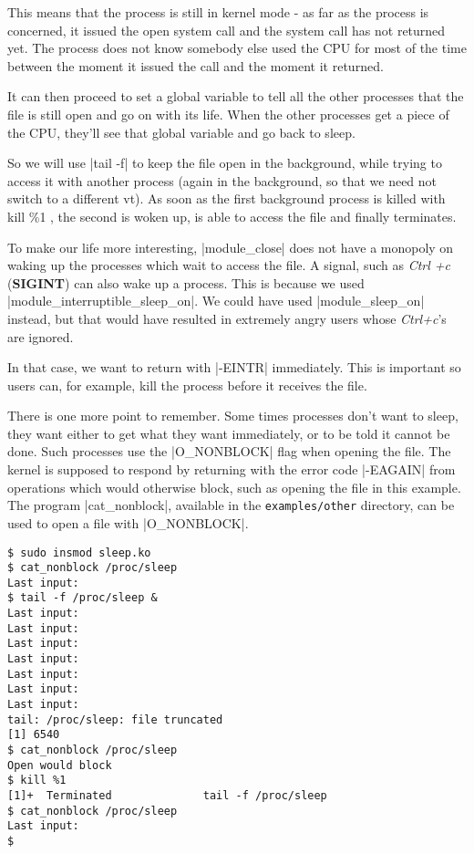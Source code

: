 \documentclass[10pt, oneside]{book}
\begin{document}
This means that the process is still in kernel mode - as far as the process is concerned, it issued the open system call and the system call has not returned yet.
The process does not know somebody else used the CPU for most of the time between the moment it issued the call and the moment it returned.

It can then proceed to set a global variable to tell all the other processes that the file is still open and go on with its life.
When the other processes get a piece of the CPU, they'll see that global variable and go back to sleep.

So we will use \sh|tail -f| to keep the file open in the background, while trying to access it with another process (again in the background, so that we need not switch to a different vt).
As soon as the first background process is killed with kill \%1 , the second is woken up, is able to access the file and finally terminates.

To make our life more interesting, \cpp|module_close| does not have a monopoly on waking up the processes which wait to access the file.
A signal, such as \emph{Ctrl +c} (\textbf{SIGINT}) can also wake up a process. This is because we used \cpp|module_interruptible_sleep_on|.
We could have used \cpp|module_sleep_on| instead, but that would have resulted in extremely angry users whose \emph{Ctrl+c}'s are ignored.

In that case, we want to return with \cpp|-EINTR| immediately. This is important so users can, for example, kill the process before it receives the file.

There is one more point to remember. Some times processes don't want to sleep, they want either to get what they want immediately, or to be told it cannot be done.
Such processes use the \cpp|O_NONBLOCK| flag when opening the file.
The kernel is supposed to respond by returning with the error code \cpp|-EAGAIN| from operations which would otherwise block, such as opening the file in this example. The program \sh|cat_nonblock|, available in the \verb|examples/other| directory, can be used to open a file with \cpp|O_NONBLOCK|.

\begin{verbatim}
$ sudo insmod sleep.ko
$ cat_nonblock /proc/sleep
Last input:
$ tail -f /proc/sleep &
Last input:
Last input:
Last input:
Last input:
Last input:
Last input:
Last input:
tail: /proc/sleep: file truncated
[1] 6540
$ cat_nonblock /proc/sleep
Open would block
$ kill %1
[1]+  Terminated              tail -f /proc/sleep
$ cat_nonblock /proc/sleep
Last input:
$
\end{verbatim}
\end{document}
